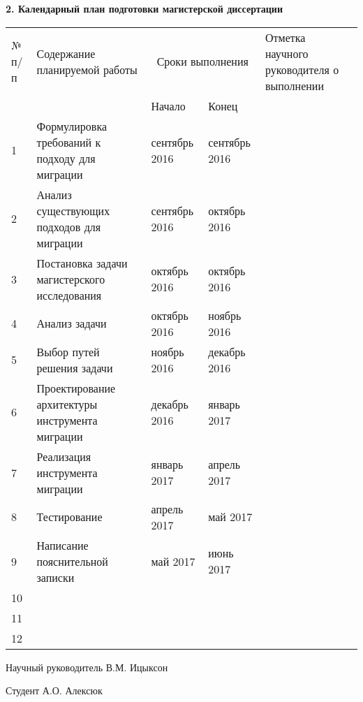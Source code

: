\begin{center}

\textbf{2. Календарный план подготовки магистерской диссертации}

\vspace{1em}

\begin{tabularx}{\textwidth}{| p{0.5cm} | p{5.5cm} | X | X | p{3cm} |}
\hline
№ п/п & Содержание планируемой работы & \multicolumn{2}{|c|}{Сроки выполнения}
& Отметка \mbox{научного} \mbox{руководителя} о выполнении \\ \cline{3-4}
& & Начало & Конец & \\ \hline
1 & Формулировка требований к подходу для миграции & сентябрь 2016 & сентябрь 2016 & \\ \hline
2 & Анализ существующих подходов для миграции & сентябрь 2016 & октябрь 2016 & \\ \hline
3 & Постановка задачи магистерского исследования & октябрь 2016 & октябрь 2016 & \\ \hline
4 & Анализ задачи & октябрь 2016 & ноябрь 2016 & \\ \hline
5 & Выбор путей решения задачи & ноябрь 2016 & декабрь 2016 & \\ \hline
6 & Проектирование архитектуры инструмента миграции & декабрь 2016 & январь 2017 & \\ \hline
7 & Реализация инструмента миграции & январь 2017 & апрель 2017 & \\ \hline
8 & Тестирование & апрель 2017 & май 2017 & \\ \hline
9 & Написание пояснительной записки & май 2017 & июнь 2017 & \\ \hline
10 & & & & \\ \hline
11 & & & & \\ \hline
12 & & & & \\ \hline
\end{tabularx}

\end{center}

\vspace{1em}

Научный руководитель \uline{\hfill} В.М. Ицыксон

\vspace{1em}

Студент \uline{\hfill} А.О. Алексюк
